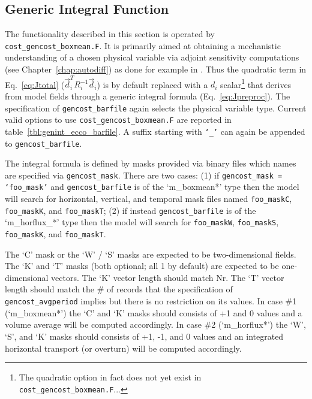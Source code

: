 \clearpage

\subsection{Generic Integral Function} \label{intgen}

The functionality described in this section is operated by \texttt{cost\_gencost\_boxmean.F}. It is primarily aimed at obtaining a mechanistic understanding of a chosen physical variable via adjoint sensitivity computations (see Chapter~\ref{chap:autodiff}) as done for example in \cite{maro-eta:99,heim-eta:11,fuku-etal:14}. Thus the quadratic term in Eq.~\ref{eq:Jtotal} ($\vec{d}_i^T R_i^{-1} \vec{d}_i$) is by default replaced with a $d_i$ scalar\footnote{The quadratic option in fact does not yet exist in \texttt{cost\_gencost\_boxmean.F}...} that derives from model fields through a generic integral formula (Eq.~\ref{eq:Jpreproc}). The specification of \texttt{gencost\_barfile} again selects the physical variable type. Current valid options to use \texttt{cost\_gencost\_boxmean.F} are reported in table~\ref{tbl:genint_ecco_barfile}. A suffix starting with \texttt{`\_'} can again be appended to \texttt{gencost\_barfile}.

The integral formula is defined by masks provided via binary files which names are specified via \texttt{gencost\_mask}. There are two cases: (1) if \texttt{gencost\_mask = `foo\_mask'} and \texttt{gencost\_barfile} is of the `m\_boxmean*' type then the model will search for horizontal, vertical, and temporal mask files  named \texttt{foo\_maskC}, \texttt{foo\_maskK}, and \texttt{foo\_maskT}; (2) if instead \texttt{gencost\_barfile} is of the `m\_horflux\_*' type then the model will search for \texttt{foo\_maskW}, \texttt{foo\_maskS}, \texttt{foo\_maskK}, and \texttt{foo\_maskT}. 

The `C' mask or the `W' / `S' masks are expected to be two-dimensional fields. The `K' and `T' masks (both optional; all 1 by default) are expected to be one-dimensional vectors. The `K' vector length should match Nr. The `T' vector length should match the \# of records that the specification of \texttt{gencost\_avgperiod} implies but there is no restriction on its values. In case \#1 (`m\_boxmean*') the `C' and `K' masks should consists of +1 and 0 values and a volume average will be computed accordingly. In case \#2 (`m\_horflux*') the `W', `S', and `K' masks should consists of +1, -1, and 0 values and an integrated horizontal transport (or overturn) will be computed accordingly. 

